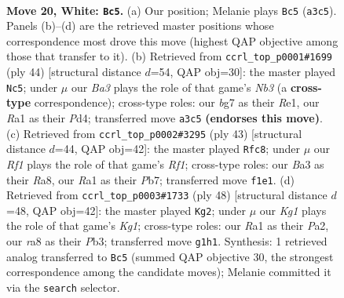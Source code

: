 \documentclass[11pt]{article}
\begin{document}
\clearpage

\begin{figure}[p]\centering
\begin{subfigure}{0.46\textwidth}\centering
\resizebox{\linewidth}{!}{%
\newchessgame
\chessboard[
  setfen={rn4kr/6b1/8/p2p2pp/3P4/B7/P2N1PPP/R4RK1 w - - 0 20},
  showmover=false,
  pgfstyle=straightmove, color=movearrow, markmove={a3-c5}
]}
\caption{}
\end{subfigure}\hfill
\begin{subfigure}{0.46\textwidth}\centering
\resizebox{\linewidth}{!}{%
\newchessgame
\chessboard[
  setfen={rr2b1k1/5pp1/pP5p/3p4/3P4/1N6/1P3PPP/2R1R1K1 w - - 1 23},
  showmover=false,
  pgfstyle=straightmove, color=movearrow, markmove={b3-c5}
]}
\caption{}
\end{subfigure}
\\[4pt]
\begin{subfigure}{0.46\textwidth}\centering
\resizebox{\linewidth}{!}{%
\newchessgame
\chessboard[
  setfen={r4rk1/1p1n2pp/p7/3p1p2/1P1P4/R7/1P1BPP1P/R5K1 b - - 0 22},
  showmover=false,
  pgfstyle=straightmove, color=movearrow, markmove={f8-c8}
]}
\caption{}
\end{subfigure}\hfill
\begin{subfigure}{0.46\textwidth}\centering
\resizebox{\linewidth}{!}{%
\newchessgame
\chessboard[
  setfen={2r1r1k1/1p3pp1/p7/2b3B1/8/1P1R1P2/P4P1P/5RK1 w - - 1 25},
  showmover=false,
  pgfstyle=straightmove, color=movearrow, markmove={g1-g2}
]}
\caption{}
\end{subfigure}
\caption{\textbf{Move 20, White: \texttt{Bc5}.} (a) Our position; Melanie plays \texttt{Bc5} (\texttt{a3c5}). Panels (b)--(d) are the retrieved master positions whose correspondence most drove this move (highest QAP objective among those that transfer to it). (b) Retrieved from \texttt{ccrl\_top\_p0001\#1699} (ply 44) [structural distance $d$=54, QAP obj=30]: the master played \texttt{Nc5}; under $\mu$ our \emph{Ba3} plays the role of that game's \emph{Nb3} (a \textbf{cross-type} correspondence); cross-type roles: our \emph{b}g7 as their \emph{R}e1, our \emph{R}a1 as their \emph{P}d4; transferred move \texttt{a3c5} \textbf{(endorses this move)}. (c) Retrieved from \texttt{ccrl\_top\_p0002\#3295} (ply 43) [structural distance $d$=44, QAP obj=42]: the master played \texttt{Rfc8}; under $\mu$ our \emph{Rf1} plays the role of that game's \emph{Rf1}; cross-type roles: our \emph{B}a3 as their \emph{R}a8, our \emph{R}a1 as their \emph{P}b7; transferred move \texttt{f1e1}. (d) Retrieved from \texttt{ccrl\_top\_p0003\#1733} (ply 48) [structural distance $d$=48, QAP obj=42]: the master played \texttt{Kg2}; under $\mu$ our \emph{Kg1} plays the role of that game's \emph{Kg1}; cross-type roles: our \emph{R}a1 as their \emph{P}a2, our \emph{r}a8 as their \emph{P}b3; transferred move \texttt{g1h1}. Synthesis: 1 retrieved analog transferred to \texttt{Bc5} (summed QAP objective 30, the strongest correspondence among the candidate moves); Melanie committed it via the \texttt{search} selector.}
\label{fig:thought-m38}
\end{figure}
\end{document}
